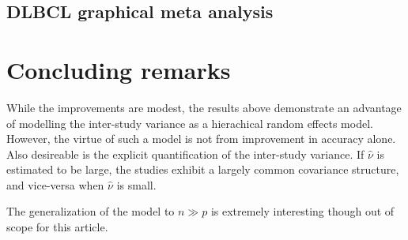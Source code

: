 \documentclass{article}\usepackage[]{graphicx}\usepackage[]{color}
\begin{document}
\subsection{DLBCL graphical meta analysis}


\section{Concluding remarks}
While the improvements are modest, the results above demonstrate an advantage of modelling the inter-study variance as a hierachical random effects model. However, the virtue of such a model is not from improvement in accuracy alone. Also desireable is the explicit quantification of the inter-study variance. If $\hat{\nu}$ is estimated to be large, the studies exhibit  a largely common covariance structure, and vice-versa when $\hat{\nu}$ is small.

The generalization of the model to $n \gg p$ is extremely interesting though out of scope for this article.



\newpage




\newpage
\appendix
\end{document}
